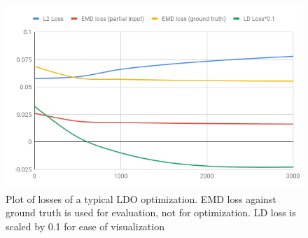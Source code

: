 \documentclass[10pt,twocolumn,letterpaper]{article}
\begin{document}
\begin{figure}
\begin{center}
\includegraphics[width=1\linewidth]{chart.png}
\end{center}
\caption{Plot of losses of a typical LDO optimization. EMD loss against ground truth is used for evaluation, not for optimization. LD loss is scaled by 0.1 for ease of visualization}
\label{fig:plot}
\end{figure}
\end{document}
